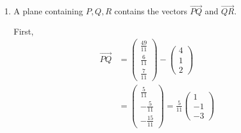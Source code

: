 \documentclass[leqno]{article}
\begin{document}
\begin{enumerate}[
  label=\textbf{\arabic*.},
  leftmargin=*,
  topsep=0pt,
  partopsep=0pt,
  parsep=0pt
]
\begin{tcolorbox}[colback=white, colframe=scarlet, title={\textbf{Solution}}, breakable, grow to left by=6mm, grow to right by=10mm]
\begin{enumerate}[label=\textbf{(\alph*)}]
So
\begin{align*}
Q
&=
\begin{pmatrix}4\\1\\2\end{pmatrix}
-\frac{5}{11}
\begin{pmatrix}-1\\1\\3\end{pmatrix}\\
&=
\begin{pmatrix}
4+\frac{5}{11}\\[2pt]
1-\frac{5}{11}\\[2pt]
2-\frac{15}{11}
\end{pmatrix}\\
&=
\begin{pmatrix}
\frac{49}{11}\\[2pt]
\frac{6}{11}\\[2pt]
\frac{7}{11}
\end{pmatrix}
\end{align*}

Hence
\[
Q\left(\frac{49}{11},\frac{6}{11},\frac{7}{11}\right)
\]

  \item A plane containing \(P,Q,R\) contains the vectors \(\overrightarrow{PQ}\) and \(\overrightarrow{QR}\).

First,
\begin{align*}
\overrightarrow{PQ}
&=
\begin{pmatrix}\frac{49}{11}\\[2pt]\frac{6}{11}\\[2pt]\frac{7}{11}\end{pmatrix}
-
\begin{pmatrix}4\\1\\2\end{pmatrix}\\
&=
\begin{pmatrix}
\frac{5}{11}\\[2pt]
-\frac{5}{11}\\[2pt]
-\frac{15}{11}
\end{pmatrix}
=
\frac{5}{11}
\begin{pmatrix}
1\\-1\\-3
\end{pmatrix}
\end{align*}


\end{enumerate}
\end{tcolorbox}
\end{enumerate}
\end{document}
